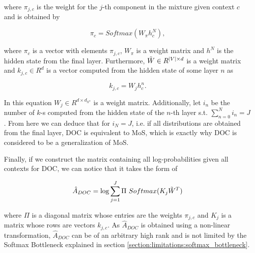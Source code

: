 where $ \pi_{j, c} $ is the weight for the $ j $-th component in the mixture given context $ c $ and is obtained by

\begin{displaymath}
    \pi_{c} = Softmax(W_\pi h^N_c),
\end{displaymath}

where $ \pi_{c} $ is a vector with elements $ \pi_{j, c} $, $ W_\pi $ is a weight matrix and $ h^N $ is the hidden state from the final layer. Furthermore, $ \Tilde{W} \in R^{|V| \times d} $ is a weight matrix and $ k_{j,c} \in R^d $ is a vector computed from the hidden state of some layer $ n $ as

\begin{displaymath}
    k_{j, c} = W_j h^n_c.
\end{displaymath}

In this equation $ W_j \in R^{d \times d_{h^n}} $ is a weight matrix. Additionally, let $ i_n $ be the number of $ k $-s computed from the hidden state of the $ n $-th layer s.t. $ \sum_{n=0}^N i_n = J $. From here we can deduce that for $ i_N = J $, i.e. if all distributions are obtained from the final layer, DOC is equivalent to MoS, which is exactly why DOC is considered to be a generalization of MoS.

Finally, if we construct the matrix containing all log-probabilities given all contexts for DOC, we can notice that it takes the form of

\begin{displaymath}
    \hat{A}_{DOC} = \log \sum_{j=1}^J \Pi \ Softmax(K_j \Tilde{W}^T)
\end{displaymath}

where $ \Pi $ is a diagonal matrix whose entries are the weights $ \pi_{j, c} $ and $ K_j $ is a matrix whose rows are vectors $ k_{j,c} $. As $ \hat{A}_{DOC} $ is obtained using a non-linear transformation, $ \hat{A}_{DOC} $ can be of an arbitrary high rank and is not limited by the Softmax Bottleneck explained in section \ref{section:limitations:softmax_bottleneck}.
